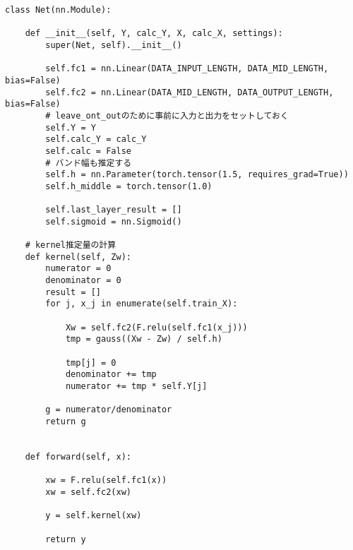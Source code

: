 \begin{lstlisting}[caption=Pytorchを用いたK-AFの計算用のクラス,label=fuga]
class Net(nn.Module):

    def __init__(self, Y, calc_Y, X, calc_X, settings):
        super(Net, self).__init__()

        self.fc1 = nn.Linear(DATA_INPUT_LENGTH, DATA_MID_LENGTH, bias=False)
        self.fc2 = nn.Linear(DATA_MID_LENGTH, DATA_OUTPUT_LENGTH, bias=False)
        # leave_ont_outのために事前に入力と出力をセットしておく
        self.Y = Y
        self.calc_Y = calc_Y
        self.calc = False
        # バンド幅も推定する
        self.h = nn.Parameter(torch.tensor(1.5, requires_grad=True))
        self.h_middle = torch.tensor(1.0)

        self.last_layer_result = []
        self.sigmoid = nn.Sigmoid()

    # kernel推定量の計算
    def kernel(self, Zw):
        numerator = 0
        denominator = 0
        result = []
        for j, x_j in enumerate(self.train_X):

            Xw = self.fc2(F.relu(self.fc1(x_j)))
            tmp = gauss((Xw - Zw) / self.h)

            tmp[j] = 0
            denominator += tmp
            numerator += tmp * self.Y[j]

        g = numerator/denominator
        return g


    def forward(self, x):

        xw = F.relu(self.fc1(x))
        xw = self.fc2(xw)

        y = self.kernel(xw)

        return y


\end{lstlisting}